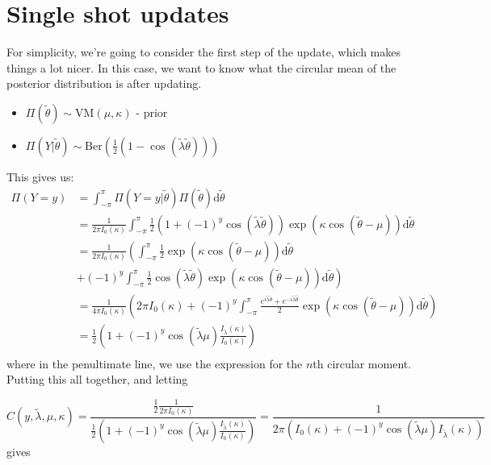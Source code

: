 \documentclass[]{report}
\begin{document}
\section{Single shot updates}
For simplicity, we're going to consider the first step of the update, which makes things a lot nicer. In this case, we want to know what the circular mean of the posterior distribution is after updating.

\begin{itemize}
	\item $\Pi(\tilde{\theta}) \sim \text{VM}(\mu, \kappa)$ - prior
	\item $\Pi(Y | \tilde{\theta}) \sim \text{Ber}(\frac{1}{2}(1 - \cos(\tilde{\lambda} \tilde{\theta})))$
\end{itemize}

This gives us:
\begin{align*}
	\Pi(Y = y) &= \int_{-\pi}^{\pi} \Pi(Y = y | \tilde{\theta}) \Pi\left( \tilde{\theta} \right) \text{d}\tilde{\theta} \\
		   &= \frac{1}{2 \pi I_0(\kappa)} \int_{- \pi}^{\pi} \frac{1}{2} (1 + (-1)^y \cos(\tilde{\lambda} \tilde{\theta})) \exp(\kappa \cos(\tilde{\theta} - \mu)) \text{d} \tilde{\theta} \\
	&= \frac{1}{2 \pi I_0(\kappa)} \left( \int_{- \pi}^{\pi} \frac{1}{2} \exp(\kappa \cos(\tilde{\theta} - \mu)) \text{d} \tilde{\theta} \right. \\
	 &\left. + (-1)^y \int_{- \pi}^{\pi} \frac{1}{2} \cos(\tilde{\lambda} \tilde{\theta}) \exp(\kappa \cos(\tilde{\theta} - \mu)) \text{d} \tilde{\theta}  \right) \\
	 &= \frac{1}{4 \pi I_0\left( \kappa \right) }\left( 2\pi I_0\left( \kappa \right)  + (-1)^{y} \int_{-\pi}^{\pi}\frac{e^{i \tilde{\lambda} \tilde{\theta}} + e^{-i \tilde{\lambda} \tilde{\theta}}}{2}\exp\left( \kappa \cos \left( \tilde{\theta} - \mu \right)  \right) \text{d}\tilde{\theta} \right) \\
	&= \frac{1}{2}\left(1 + (-1)^y \cos(\tilde{\lambda} \mu) \frac{I_{\tilde{\lambda}}(\kappa)}{I_0(\kappa)}\right)  \\
\end{align*}
where in the penultimate line, we use the expression for the $n$th circular moment.
Putting this all together, and letting

\[
C(y, \tilde{\lambda}, \mu, \kappa) = \frac{\frac{1}{2} \frac{1}{2 \pi I_0(\kappa)}}{\frac{1}{2} (1 + (-1)^y \cos(\tilde{\lambda} \mu) \frac{I_{\tilde{\lambda}}(\kappa)}{I_0(\kappa)} )} = \frac{1}{ 2 \pi(I_0(\kappa) + (-1)^y \cos(\tilde{\lambda} \mu) I_{\tilde{\lambda}}(\kappa))}
\]
gives
\end{document}
